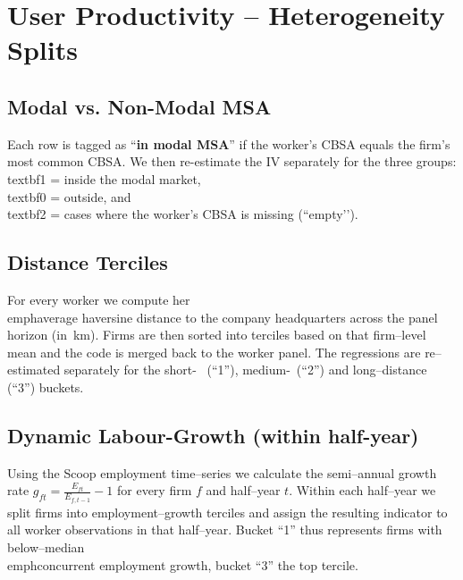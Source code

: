\documentclass{article}
\newcommand{\cleanedresultsdir}{../../results/cleaned}
\begin{document}
\clearpage
\section{User Productivity – Heterogeneity Splits}

\subsection{Modal vs. Non-Modal MSA}
Each row is tagged as “\textbf{in modal MSA}” if the worker’s CBSA equals the
firm’s most common CBSA.  We then re-estimate the IV separately for the three
groups: \\textbf{1} = inside the modal market, \\textbf{0} = outside, and
\\textbf{2} = cases where the worker’s CBSA is missing (``empty’’).


\subsection{Distance Terciles}
For every worker we compute her \\emph{average haversine distance} to the
company headquarters across the panel horizon (in~km).  Firms are then sorted
into terciles based on that firm--level mean and the code is merged back to
the worker panel.  The regressions are re--estimated separately for the short-~
(``1''), medium-~(``2'') and long--distance (``3'') buckets.


\subsection{Dynamic Labour-Growth (within half-year)}
Using the Scoop employment time--series we calculate the semi--annual growth
rate $g_{ft}=\tfrac{E_{ft}}{E_{f,t-1}}-1$ for every firm $f$ and half--year
$t$.  Within each half--year we split firms into employment--growth terciles
and assign the resulting indicator to all worker observations in that
half--year.  Bucket ``1'' thus represents firms with below--median \\emph{concurrent}
employment growth, bucket ``3'' the top tercile.

\end{document}
